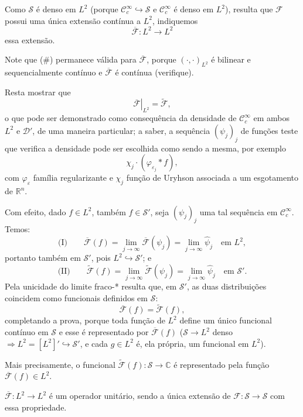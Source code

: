 \documentclass[../distribution_theory_notes.tex]{subfiles}
\begin{document}
\begin{proof*}
	Como \(\mathcal{S}\) é denso em \(L^2\) (porque \(\mathcal{C}_c^\infty\hookrightarrow\mathcal{S}\) e \(\mathcal{C}_c^\infty\) é denso em \(L^2\)), resulta que \(\mathcal{F}\) possui uma única extensão contínua a \(L^2\), indiquemos
	\[
		\overline{\mathcal{F}}:L^2\longrightarrow L^2
	\]
	essa extensão.

	Note que (\#) permanece válida para \(\overline{\mathcal{F}}\), porque \((\cdot,\cdot)_{L^2}\) é bilinear e sequencialmente contínuo e \(\overline{\mathcal{F}}\) é contínua (verifique).

	Resta mostrar que
	\[
		\left.\overline{\mathcal{F}}\right|_{L^2}=\widetilde{\mathcal{F}},
	\]
	o que pode ser demonstrado como consequência da densidade de \(\mathcal{C}_c^\infty\) em ambos \(L^2\) e \(\mathcal{D}'\), de uma maneira particular; a saber, a sequência \((\psi_j)_j\) de funções teste que verifica a densidade pode ser escolhida como sendo a mesma, por exemplo
	\[
		\chi_j\cdot(\varphi_{\varepsilon_j}*f),
	\]
	com \(\varphi_\varepsilon\) família regularizante e \(\chi_j\) função de Uryhson associada a um esgotamento de \(\mathbb{R}^n\).

	Com efeito, dado \(f\in L^2\), também \(f\in\mathcal{S}'\), seja \((\psi_j)_j\) uma tal sequência em \(\mathcal{C}_c^\infty\). Temos:
	\[
		\text{(I)}\qquad
		\overline{\mathcal{F}}(f)
		=\lim_{j\to\infty}\overline{\mathcal{F}}(\psi_j)
		=\lim_{j\to\infty}\hat\psi_j
		\quad\text{em }L^2,
	\]
	portanto também em \(\mathcal{S}'\), pois \(L^2\hookrightarrow\mathcal{S}'\); e
	\[
		\text{(II)}\qquad
		\widetilde{\mathcal{F}}(f)
		=\lim_{j\to\infty}\widetilde{\mathcal{F}}(\psi_j)
		=\lim_{j\to\infty}\hat\psi_j
		\quad\text{em }\mathcal{S}'.
	\]
	Pela unicidade do limite fraco-* resulta que, em \(\mathcal{S}'\), as duas distribuições coincidem como funcionais definidos em \(\mathcal{S}\):
	\[
		\overline{\mathcal{F}}(f)=\widetilde{\mathcal{F}}(f),
	\]
	completando a prova, porque toda função de \(L^2\) define um único funcional contínuo em \(\mathcal{S}\) e esse é representado por \(\overline{\mathcal{F}}(f)\) (\(\mathcal{S}\to L^2\) denso \(\Rightarrow L^2=[L^2]'\hookrightarrow\mathcal{S}'\), e cada \(g\in L^2\) é, ela própria, um funcional em \(L^2\)).

	Mais precisamente, o funcional \(\widetilde{\mathcal{F}}(f):\mathcal{S}\to\mathbb{C}\) é representado pela função \(\overline{\mathcal{F}}(f)\in L^2\). \qedsymbol
\end{proof*}

\begin{theorem*}[Plancherel]
	\(\overline{\mathcal{F}}:L^2\longrightarrow L^2\) é um operador unitário, sendo a única extensão de \(\mathcal{F}:\mathcal{S}\to\mathcal{S}\) com essa propriedade.
\end{theorem*}
\end{document}
